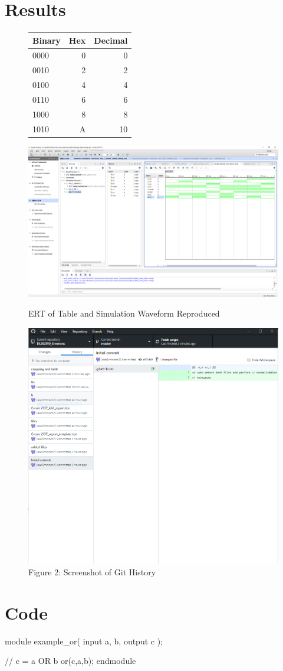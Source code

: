 \documentclass[11pt]{article}
\begin{document}
\section*{Results}
\begin{figure}[ht]\centering
	\begin{tabular}{l|r|r}
		Binary & Hex & Decimal \\
		\midrule
		0000 & 0 & 0  \\
		0010 & 2 & 2 \\
		0100 & 4 & 4  \\
		0110 & 6 & 6  \\
		1000 & 8 & 8  \\
		1010 & A & 10  \\
		\bottomrule
	\end{tabular}\medskip
			
	\includegraphics[width=1\textwidth,trim={19cm 15cm 0cm 3.5cm},clip]{lab1_example_screenshot (1).PNG}
		\caption{ERT of Table and Simulation Waveform Reproduced}
		\label{fig:original_logo}
		
		\includegraphics[width=1\textwidth,trim={0cm 9cm 0cm 0cm},clip]{githistory.PNG}
		\caption{Figure 2: Screenshot of Git History}
\end{figure}
\clearpage
\section*{Code}

module example_or(
input a, b,
output c
);

// c = a OR b
or(c,a,b);	
endmodule
\end{document}
